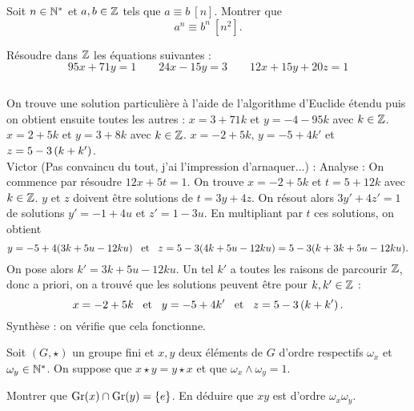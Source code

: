 \documentclass{magnolia}
\begin{document}


Soit $n\in{\mathbb{N}^*}$ et $a,b\in\mathbb{Z}$ tels que $a\equiv b\ [n]$. Montrer que
\[a^n\equiv b^n\ \left[n^2\right].\]

\magsection{$\pgcd$, $\ppcm$}

Résoudre dans $\mathbb{Z}$ les équations suivantes :
\[95x+71y=1 \qquad 24x-15y=3 \qquad 12x+15y+20z=1\]
\begin{sol}
$\quad$
\begin{questions}
\question On trouve une solution particulière à l'aide de l'algorithme d'Euclide étendu puis on obtient ensuite toutes les autres : $x=3+71k$ et $y=-4-95k$ avec $k\in\mathbb{Z}$.
\question $x=2+5k$ et $y=3+8k$ avec $k\in\mathbb{Z}$.
\question $x=-2+5k$, $y=-5+4k'$ et $z=5-3\left(k+k'\right)$.\\
Victor (Pas convaincu du tout, j'ai l'impression d'arnaquer...) : Analyse : On commence par résoudre $12x+5t=1$. On trouve $x=-2+5k$ et $t=5+12k$ avec $k\in\mathbb{Z}$. $y$ et $z$ doivent être solutions de $t=3y+4z$. On résout alors $3y'+4z'=1$ de solutions $y'=-1+4u$ et $z'=1-3u$. En multipliant par $t$ ces solutions, on obtient $$y=-5+4(3k+5u-12ku) \quad\!\text{et}\quad\! z=5-3(4k+5u-12ku)=5-3(k+3k+5u-12ku).$$ On pose alors $k'=3k+5u-12ku$. Un tel $k'$ a toutes les raisons de parcourir $\mathbb{Z}$, donc a priori, on a trouvé que les solutions peuvent être pour $k,k'\in \mathbb{Z}$ :
$$x=-2+5k \quad\!\text{et}\quad\! y=-5+4k' \quad\!\text{et}\quad\! z=5-3\left(k+k'\right).$$
Synthèse : on vérifie que cela fonctionne.
\end{questions}
\end{sol}

Soit $(G,\star)$ un groupe fini et $x,y$ deux éléments de $G$ d'ordre
respectifs $\omega_x$ et $\omega_y\in{\mathbb{N}^*}$. On suppose que $x\star y=y\star x$
et que $\omega_x\wedge\omega_y=1$.
\begin{questions}
\question Montrer que
${\rm Gr}(x)\cap{\rm Gr}(y)=\left\{e\right\}$.
\question En déduire que  $xy$ est d'ordre $\omega_x\omega_y$.
\end{questions}
\end{document}
